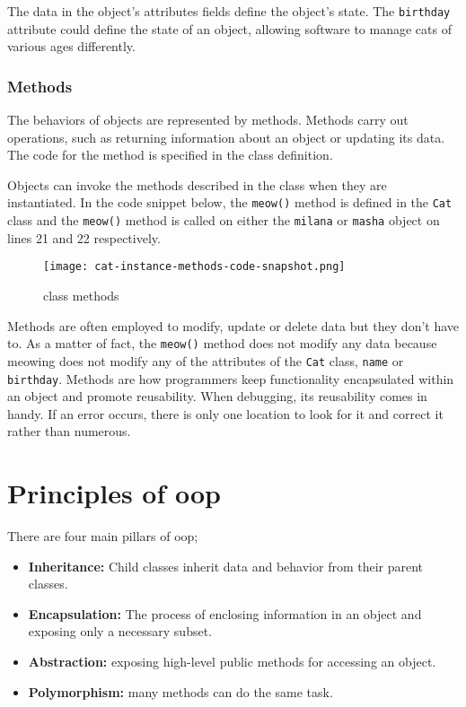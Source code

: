 The data in the object's attributes fields define the object's state. The \verb+birthday+ attribute could define the state of an object, allowing software to manage cats of various ages differently.

\subsubsection{Methods}
The behaviors of objects are represented by methods. Methods carry out operations, such as returning information about an object or updating its data. The code for the method is specified in the class definition.

Objects can invoke the methods described in the class when they are instantiated. In the code snippet below, the \verb+meow()+ method is defined in the \verb+Cat+ class and the \verb+meow()+ method is called on either the \verb+milana+ or \verb+masha+ object on lines 21 and 22 respectively.
\begin{figure}[h]
  \centering
  \texttt{[image: cat-instance-methods-code-snapshot.png]}
  \caption{class methods}
  \label{cat class methods}
\end{figure}

Methods are often employed to modify, update or delete data but they don’t have to. As a matter of fact, the \verb+meow()+ method does not modify any data because meowing does not modify any of the attributes of the \verb+Cat+ class, \verb+name+ or \verb+birthday+.
Methods are how programmers keep functionality encapsulated within an object and promote reusability. When debugging, its reusability comes in handy. If an error occurs, there is only one location to look for it and correct it rather than numerous.

\section{Principles of \acs{oop}}
There are four main pillars of \acs{oop};
\begin{itemize}
  \item \textbf{Inheritance:} Child classes inherit data and behavior from their parent classes.
  \item \textbf{Encapsulation:} The process of enclosing information in an object and exposing only a necessary subset.
  \item \textbf{Abstraction:} exposing high-level public methods for accessing an object.
  \item \textbf{Polymorphism:} many methods can do the same task.
\end{itemize}

